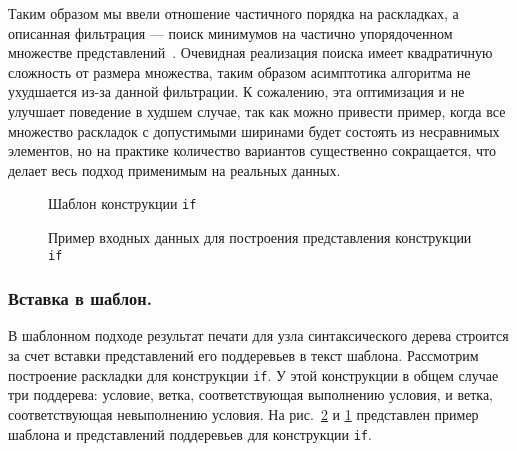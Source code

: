 Таким образом мы ввели отношение частичного порядка на раскладках, а
описанная фильтрация --- поиск минимумов на частично упорядоченном
множестве представлений~\cite{poset}.
Очевидная реализация поиска имеет квадратичную сложность от размера множества,
таким образом асимптотика алгоритма не ухудшается из-за данной фильтрации.
К сожалению, эта оптимизация и не улучшает поведение
в худшем случае, так как
можно привести пример, когда все множество раскладок с допустимыми ширинами
будет состоять из несравнимых элементов, но на практике количество вариантов
существенно сокращается, что делает весь подход применимым на реальных данных.

\begin{figure}[t]
   \centering
    \makebox[0.15\textwidth]{
      
    }
  \caption{Шаблон конструкции \lstinline{if}}
  \label{fig:ifTemplate}
\end{figure}

\begin{figure}[t]
  \subfloat[Условие]{
    \makebox[0.15\textwidth]{
      \centering
      
    }
    \label{fig:ifCond}
  }
  \quad\quad
  \quad\quad\quad
  \caption{Пример входных данных для построения представления конструкции \lstinline{if}}
  \label{fig:ifEx}
\end{figure}

\subsubsection{Вставка в шаблон.}
\label{txt:templateInsert}

В шаблонном подходе результат печати для узла синтаксического дерева строится
за счет вставки представлений его поддеревьев в текст шаблона.
Рассмотрим построение раскладки для конструкции
\lstinline{if}. У этой конструкции в общем случае три поддерева: условие,
ветка, соответствующая выполнению условия, и ветка, соответствующая
невыполнению условия.
На рис.~\ref{fig:ifEx} и \ref{fig:ifTemplate} представлен пример шаблона и представлений поддеревьев для
конструкции \lstinline{if}.

